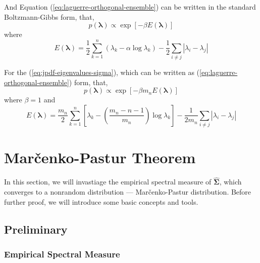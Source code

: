 And Equation (\ref{eq:laguerre-orthogonal-ensemble}) can be written in the standard Boltzmann-Gibbs form, that,
\begin{equation*}
    p\left(\boldsymbol{\lambda}\right)\propto\exp\left[-\beta E\left(\boldsymbol{\lambda}\right)\right]
\end{equation*}
where
\begin{equation}
    E\left(\boldsymbol{\lambda}\right)=\frac{1}{2}\sum_{k=1}^{n}\left(\lambda_{k}-\alpha\log\lambda_{k}\right)-\frac{1}{2}\sum_{i\neq j}\left|\lambda_{i}-\lambda_{j}\right|
\end{equation}

\begin{remark}
    For the (\ref{eq:jpdf-eigenvalues-sigma}), which can be written as (\ref{eq:laguerre-orthogonal-ensemble}) form, that,
    \begin{equation*}
        p\left(\boldsymbol{\lambda}\right)\propto\exp\left[-\beta m_{n}E\left(\boldsymbol{\lambda}\right)\right]
    \end{equation*}
    where $\beta=1$ and
    \begin{equation*}
        E\left(\boldsymbol{\lambda}\right)=\frac{m_{n}}{2}\sum_{k=1}^{n}\left[\lambda_{k}-\left(\frac{m_{n}-n-1}{m_{n}}\right)\log\lambda_{k}\right]-\frac{1}{2m_{n}}\sum_{i\neq j}\left|\lambda_{i}-\lambda_{j}\right|
    \end{equation*}
\end{remark}

\section{Marčenko-Pastur Theorem}

In this section, we will invastiage the empirical spectral measure of $\widehat{\boldsymbol{\Sigma}}$, which converges to a nonrandom distribution --- Marčenko-Pastur distribution. Before further proof, we will introduce some basic concepts and tools.

\subsection{Preliminary}

\subsubsection{Empirical Spectral Measure}

